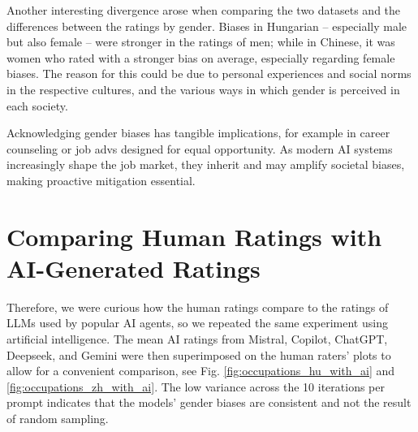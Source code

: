 \documentclass[runningheads]{llncs}
\begin{document}
Another interesting divergence arose when comparing the two datasets and the differences between the ratings by gender. Biases in Hungarian -- especially male but also female -- were stronger in the ratings of men; while in Chinese, it was women who rated with a stronger bias on average, especially regarding female biases. The reason for this could be due to personal experiences and social norms in the respective cultures, and the various ways in which gender is perceived in each society.

Acknowledging gender biases has tangible implications, for example in career counseling or job advs designed for equal opportunity. As modern AI systems increasingly shape the job market, they inherit and may amplify societal biases, making proactive mitigation essential.




\section{Comparing Human Ratings with AI-Generated Ratings}
\label{sec:ai_comparison}

Therefore, we were curious how the human ratings compare to the ratings of LLMs used by popular AI agents, so we repeated the same experiment using artificial intelligence. The mean AI ratings from Mistral, Copilot, ChatGPT, Deepseek, and Gemini were then superimposed on the human raters' plots to allow for a convenient comparison, see Fig. \ref{fig:occupations_hu_with_ai} and \ref{fig:occupations_zh_with_ai}. The low variance across the 10 iterations per prompt indicates that the models' gender biases are consistent and not the result of random sampling.
\end{document}
